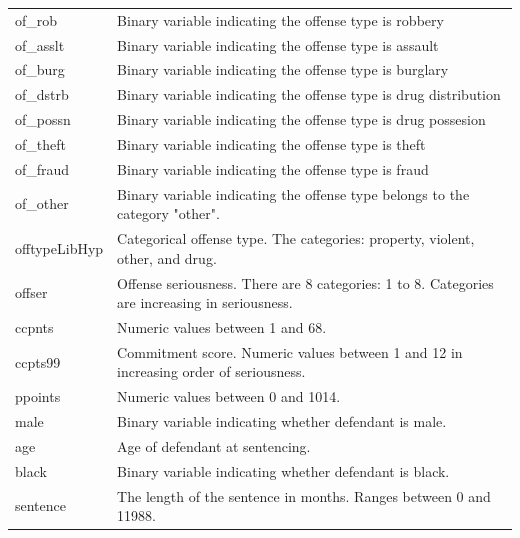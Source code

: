 \documentclass[11pt, oneside]{article}   	%
\theoremstyle{ModifiedStyle}
\begin{document}
\begin{table}[H]
\begin{tabular}{|ll|}
        of\_rob           & Binary variable indicating the offense type is robbery                      \\
        of\_asslt         & Binary variable indicating the offense type is assault                      \\
        of\_burg          & Binary variable indicating the offense type is burglary                     \\
        of\_dstrb         & Binary variable indicating the offense type is drug distribution            \\
        of\_possn         & Binary variable indicating the offense type is drug possesion               \\
        of\_theft         & Binary variable indicating the offense type is theft                        \\
        of\_fraud         & Binary variable indicating the offense type is fraud                        \\
        of\_other       & Binary variable indicating the offense type belongs to the category "other".                                  \\
        offtypeLibHyp   & Categorical offense type. The categories: property, violent, other, and drug.                                 \\
        offser          & Offense seriousness. There are 8 categories: 1 to 8. Categories are increasing in seriousness.                \\
        ccpnts            & Numeric values between 1 and 68.                                            \\
        ccpts99         & Commitment score. Numeric values between 1 and 12 in increasing order of seriousness.                         \\
        ppoints           & Numeric values between 0 and 1014.                                          \\
        male              & Binary variable indicating whether defendant is male.                       \\
        age               & Age of defendant at sentencing.                                             \\
        black             & Binary variable indicating whether defendant is black.                      \\
        sentence          & The length of the sentence in months. Ranges between 0 and 11988.           \\ \hline
        \end{tabular}
      \end{table}
\end{document}
